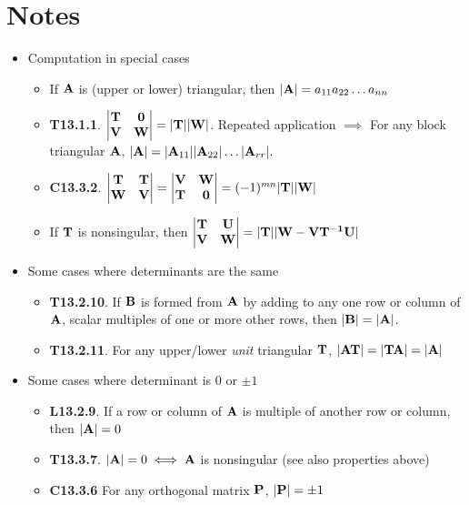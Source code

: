 \documentclass[a4paper, oneside]{book}
\begin{document}
\section{Notes}
\begin{itemize}
\item Computation in special cases
	\begin{itemize}
	\item If $\mathbf{A}$ is (upper or lower) triangular, then $|\mathbf{A}|=a_{11}a_{22}\hdots a_{nn}$
	\item \textbf{T13.1.1}. $\left|\begin{matrix} \mathbf{T}  & \mathbf{0} \\\mathbf{V} & \mathbf{W} \end{matrix}\right|=\mathbf{|T||W|}$. Repeated application $\implies$ For any block triangular $\mathbf{A}$, $|\mathbf{A}|=|\mathbf{A}_{11}||\mathbf{A}_{22}|\hdots |\mathbf{A}_{rr}|.$
	\item \textbf{C13.3.2}. $\left|\begin{matrix} \mathbf{T}  & \mathbf{T} \\\mathbf{W} & \mathbf{V} \end{matrix}\right|=\left|\begin{matrix} \mathbf{V}  & \mathbf{W} \\\mathbf{T} & \mathbf{0} \end{matrix}\right|=(-1)^{mn}\mathbf{|T||W|}$ 
	\item If $\mathbf{T}$ is nonsingular, then $\left|\begin{matrix} \mathbf{T}  & \mathbf{U} \\\mathbf{V} & \mathbf{W} \end{matrix}\right|=\mathbf{|T||W-VT^{-1}U|}$	\end{itemize}
\item Some cases where determinants are the same
	\begin{itemize}
	\item \textbf{T13.2.10}. If $\mathbf{B}$ is formed from $\mathbf{A}$ by adding to any one row or column of $\mathbf{A}$, scalar multiples of one or more other rows, then $|\mathbf{B}|=|\mathbf{A}|$.
	\item \textbf{T13.2.11}. For any upper/lower \textit{unit} triangular $\mathbf{T}$, $\mathbf{|AT|=|TA|=|A|}$
	\end{itemize}
\item Some cases where determinant is $0$ or $\pm 1$
	\begin{itemize}
	\item \textbf{L13.2.9}. If a row or column of $\mathbf{A}$ is multiple of another row or column, then $|\mathbf{A}|=0$
	\item \textbf{T13.3.7}. $|\mathbf{A}|=0 \iff \mathbf{A}$ is nonsingular (see also properties above)
	\item \textbf{C13.3.6} For any orthogonal matrix $\mathbf{P}$, $|\mathbf{P}|=\pm 1$
	\end{itemize}
\end{itemize}
\end{document}
